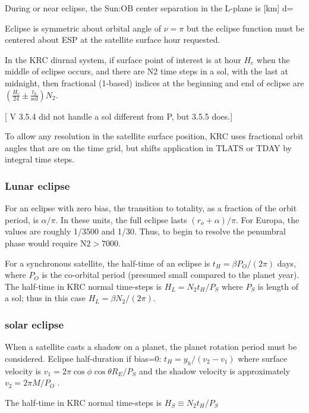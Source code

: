 \documentclass{article}
\begin{document}
During or near eclipse, the Sun:OB center separation in the L-plane is [km]  
\qb d= \qe

Eclipse is symmetric about orbital angle of $\nu = \pi$ but the eclipse function
must be centered about ESP at the satellite surface hour requested.

In the KRC diurnal system, if surface point of interest is at hour $H_c$ when
the middle of eclipse occurs, and there are N2 time steps in a sol, with the
last at midnight, then fractional (1-based) indices at the beginning and end of
eclipse are $ \left(\frac{H_c}{24} \pm \frac{t_h}{\mathrm{sol}} \right)  N_2$.

[ V 3.5.4 did not handle a sol different from P, but 3.5.5 does.]

To allow any resolution in the satellite surface position, KRC uses fractional
orbit angles that are on the time grid, but shifts application in TLATS or TDAY
by integral time steps.

\subsubsection{Lunar eclipse}

For an eclipse with zero bias, the transition to totality, as a fraction of the orbit period, is $\alpha /\pi$. In these units, the full eclipse lasts $(r_o
+\alpha)/\pi$. For Europa, the values are roughly 1/3500 and 1/30. Thus, to begin
to resolve the penumbral phase would require N2$>7000$.

For a synchronous satellite, the half-time of an eclipse is $t_H= \beta
P_O/(2\pi)$ days, where $P_O$ is the co-orbital period (presumed small compared
to the planet year). The half-time in KRC normal time-steps is $H_L= N_2
t_H /P_S $ where $P_S$ is length of a sol; thus in this case $H_L= \beta N_2 / (2 \pi)$.

\subsubsection{solar eclipse}
When a satellite casts a shadow on a planet, the planet rotation period must be considered. Eclipse half-duration if bias=0:  $t_H=y_h /(v_2-v_1)$ 
where surface velocity is $ v_1 = 2 \pi \cos \phi \cos \theta R_E / P_S$ 
and the shadow velocity is approximately $v_2= 2 \pi M /  P_O$ .

The half-time in KRC normal time-steps is $H_S \equiv N_2 t_H/P_S$
\end{document}
